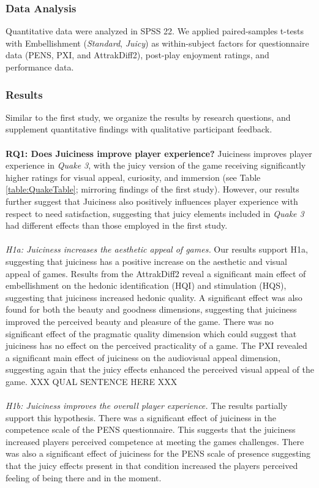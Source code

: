 \documentclass{sigchi}
\begin{document}
\subsubsection{Data Analysis}
Quantitative data were analyzed in SPSS 22. We applied paired-samples t-tests with Embellishment (\textit{Standard}, \textit{Juicy}) as within-subject factors for questionnaire data (PENS, PXI, and AttrakDiff2), post-play enjoyment ratings, and performance data.
\subsubsection{Results}
Similar to the first study, we organize the results by research questions, and supplement quantitative findings with qualitative participant feedback.
\\\\
\textbf{RQ1: Does Juiciness improve player experience?} Juiciness improves player experience in \textit{Quake 3}, with the juicy version of the game receiving significantly higher ratings for visual appeal, curiosity, and immersion (see Table \ref{table:QuakeTable}; mirroring findings of the first study). However, our results further suggest that Juiciness also positively influences player experience with respect to need satisfaction, suggesting that juicy elements included in \textit{Quake 3} had different effects than those employed in the first study.
\\\\
\textit{H1a: Juiciness increases the aesthetic appeal of games.} Our results support H1a, suggesting that juiciness has a positive increase on the aesthetic and visual appeal of games. Results from the AttrakDiff2 reveal a significant main effect of embellishment on the hedonic identification (HQI) and stimulation (HQS), suggesting that juiciness increased hedonic quality. A significant effect was also found for both the beauty and goodness dimensions, suggesting that juiciness improved the perceived beauty and pleasure of the game. There was no significant effect of the pragmatic quality dimension which could suggest that juiciness has no effect on the perceived practicality of a game. The PXI revealed a significant main effect of juiciness on the audiovisual appeal dimension, suggesting again that the juicy effects enhanced the perceived visual appeal of the game. XXX QUAL SENTENCE HERE XXX 
\\\\
\textit{H1b: Juiciness improves the overall player experience.} The results partially support this hypothesis. There was a significant effect of juiciness in the competence scale of the PENS questionnaire. This suggests that the juiciness increased players perceived competence at meeting the games challenges. There was also a significant effect of juiciness for the PENS scale of presence suggesting that the juicy effects present in that condition increased the players perceived feeling of being there and in the moment. 
\end{document}
